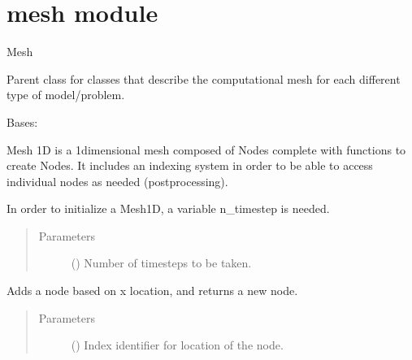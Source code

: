 \documentclass[letterpaper,10pt,english]{sphinxmanual}
\begin{document}
\section{mesh module}
\label{\detokenize{mesh:module-mesh}}\label{\detokenize{mesh:mesh-module}}\label{\detokenize{mesh::doc}}
\sphinxAtStartPar
Mesh

\sphinxAtStartPar
Parent class for classes that describe the computational mesh for each
different type of model/problem.

\begin{fulllineitems}
\label{\detokenize{mesh:mesh.Mesh1D}}
\sphinxAtStartPar
Bases: 

\sphinxAtStartPar
Mesh 1D is a 1\sphinxhyphen{}dimensional mesh composed of Nodes complete with
functions to create Nodes. It includes an indexing system in order
to be able to access individual nodes as needed (post\sphinxhyphen{}processing).

\sphinxAtStartPar
In order to initialize a Mesh1D, a variable n\_timestep is needed.
\begin{quote}\begin{description}
\item[{Parameters}] \leavevmode
\sphinxAtStartPar
{} (\sphinxstyleliteralemphasis{\sphinxupquote{{[}}}\sphinxstyleliteralemphasis{\sphinxupquote{{]}}}) \textendash{} Number of timesteps to be taken.

\end{description}\end{quote}

\begin{fulllineitems}
\label{\detokenize{mesh:mesh.Mesh1D.add_node}}
\sphinxAtStartPar
Adds a node based on x location, and returns a new node.
\begin{quote}\begin{description}
\item[{Parameters}] \leavevmode
\sphinxAtStartPar
{} (\sphinxstyleliteralemphasis{\sphinxupquote{{[}}}\sphinxstyleliteralemphasis{\sphinxupquote{{]}}}) \textendash{} Index identifier for location of the node.


\end{description}
\end{quote}
\end{fulllineitems}
\end{fulllineitems}
\end{document}
